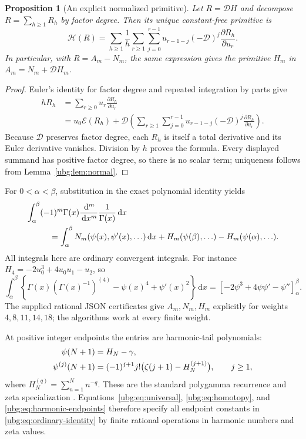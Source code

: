 \documentclass[11pt,letterpaper]{article}
\numberwithin{equation}{section}
\newtheorem{proposition}[theorem]{Proposition}
\theoremstyle{definition}\newtheorem{definition}[theorem]{Definition}
\theoremstyle{remark}\newtheorem{remark}[theorem]{Remark}
\newcommand{\D}{\mathcal D}\newcommand{\NF}{\mathcal N}\newcommand{\HF}{\mathcal H}
\newcommand{\dd}{\,\mathrm d}\newcommand{\ii}{\mathrm i}
\begin{document}
\begin{proposition}[An explicit normalized primitive]
\label{ubg:prop:homotopy}
Let $R=\D H$ and decompose $R=\sum_{h\ge1}R_h$ by factor degree.
Then its unique constant-free primitive is
\begin{equation}\label{ubg:eq:homotopy}
 \boxed{\displaystyle
 \HF(R)=\sum_{h\ge1}\frac1h
  \sum_{r\ge1}\sum_{j=0}^{r-1}
   u_{r-1-j}(-\D)^j\frac{\partial R_h}{\partial u_r}.}
\end{equation}
In particular, with $R=A_m-N_m$, the same expression gives the
primitive $H_m$ in $A_m=N_m+\D H_m$.
\end{proposition}
\begin{proof}
Euler's identity for factor degree and repeated integration by parts give
\begin{align*}
 hR_h&=\sum_{r\ge0}u_r\frac{\partial R_h}{\partial u_r}\\
 &=u_0\mathscr E(R_h)+\D\left(
    \sum_{r\ge1}\sum_{j=0}^{r-1}
        u_{r-1-j}(-\D)^j\frac{\partial R_h}{\partial u_r}\right).
\end{align*}
Because $\D$ preserves factor degree, each $R_h$ is itself a total
derivative and its Euler derivative vanishes. Division by $h$ proves
the formula. Every displayed summand has positive factor degree, so
there is no scalar term; uniqueness follows from
Lemma~\ref{ubg:lem:normal}.
\end{proof}

For $0<\alpha<\beta$, substitution in the exact polynomial identity yields
\begin{align}
 &\int_\alpha^\beta(-1)^m\Gamma(x)
             \frac{\dd^m}{\dd x^m}\frac1{\Gamma(x)}\dd x\notag\\
 &\hspace{1cm}=\int_\alpha^\beta N_m(\psi(x),\psi'(x),\ldots)\dd x
      +H_m(\psi(\beta),\ldots)-H_m(\psi(\alpha),\ldots).
 \label{ubg:eq:ordinary-identity}
\end{align}
All integrals here are ordinary convergent integrals.
For instance $H_4=-2u_0^3+4u_0u_1-u_2$, so
\begin{equation}\label{ubg:eq:fourth-identity}
 \int_\alpha^\beta
 \left\{\Gamma(x)(\Gamma(x)^{-1})^{(4)}-\psi(x)^4+\psi'(x)^2\right\}\dd x
 =\left[-2\psi^3+4\psi\psi'-\psi''\right]_\alpha^\beta.
\end{equation}
The supplied rational JSON certificates give $A_m,N_m,H_m$ explicitly
for weights $4,8,11,14,18$; the algorithms work at every finite weight.

At positive integer endpoints the entries are harmonic-tail polynomials:
\begin{align}
 \psi(N+1)&=H_N-\gamma,\notag\\
 \psi^{(j)}(N+1)&=(-1)^{j+1}j!
          \bigl(\zeta(j+1)-H_N^{(j+1)}\bigr),\qquad j\ge1,
 \label{ubg:eq:harmonic-endpoints}
\end{align}
where $H_N^{(q)}=\sum_{n=1}^Nn^{-q}$. These are the standard
polygamma recurrence and zeta specialization \cite{DLMFpsi}.
Equations~\eqref{ubg:eq:universal}, \eqref{ubg:eq:homotopy}, and
\eqref{ubg:eq:harmonic-endpoints} therefore specify all endpoint constants
in \eqref{ubg:eq:ordinary-identity} by finite rational operations in
harmonic numbers and zeta values.
\end{document}
